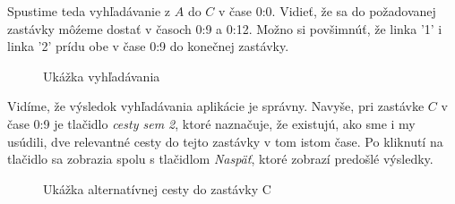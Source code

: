 Spustime teda vyhľadávanie z $A$ do $C$ v čase 0:0. Vidieť, že sa do požadovanej zastávky môźeme dostať v časoch 0:9 a 0:12. Možno si povšimnúť, že linka '1' i linka '2' prídu obe v čase 0:9 do konečnej zastávky.\newline

\begin{figure}[H]
  \caption{Ukážka vyhľadávania}
  \label{ukazka_programu2}
\end{figure}

Vidíme, že výsledok vyhľadávania aplikácie je správny. Navyše, pri zastávke $C$ v čase 0:9 je tlačidlo \textit{cesty sem 2}, ktoré naznačuje, že existujú, ako sme i my usúdili, dve relevantné cesty do tejto zastávky v tom istom čase. Po kliknutí na tlačidlo sa zobrazia spolu s tlačidlom \textit{Naspäť}, ktoré zobrazí predošlé výsledky.\newline

\begin{figure}[H]
  \caption{Ukážka alternatívnej cesty do zastávky C}
  \label{ukazka_programu2_alt}
\end{figure}



